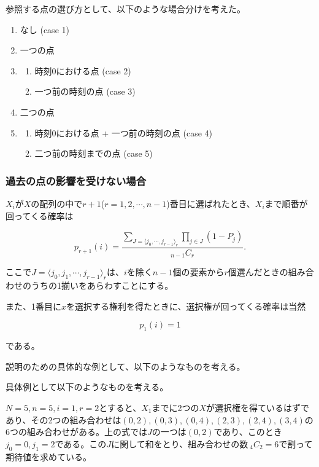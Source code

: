 参照する点の選び方として、以下のような場合分けを考えた。

\begin{enumerate}
    \item なし (case 1)
    \item 一つの点
    \item \begin{enumerate}
        \item 時刻0における点 (case 2)
        \item 一つ前の時刻の点 (case 3)
        \end{enumerate}
    \item 二つの点
    \item \begin{enumerate}
        \item 時刻0における点 + 一つ前の時刻の点 (case 4)
        \item 二つ前の時刻までの点 (case 5)
        \end{enumerate}
\end{enumerate}

\subsubsection{過去の点の影響を受けない場合}

$X_{i}$が$X$の配列の中で$r+1$($r = 1, 2, \cdots , n-1$)番目に選ばれたとき、$X_{i}$まで順番が回ってくる確率は

$$p_{r+1}(i) = \frac{\sum_{J = \langle j_{0}, \cdots ,j_{r-1} \rangle _{r}}\prod_{j\in J}(1-P_{j})}{_{n-1}C_{r}}.$$

ここで$J = \langle j_{0}, j_{1}, \cdots ,j_{r-1} \rangle_{r}$は、$i$を除く$n-1$個の要素から$r$個選んだときの組み合わせのうちの1揃いをあらわすことにする。

また、1番目に$x$を選択する権利を得たときに、選択権が回ってくる確率は当然

$$p_{1}(i) = 1$$

である。

説明のための具体的な例として、以下のようなものを考える。

具体例として以下のようなものを考える。

$N = 5, n = 5, i = 1, r = 2$とすると、$X_{1}$までに2つの$X$が選択権を得ているはずであり、その2つの組み合わせは$(0,2), (0,3), (0,4), (2,3), (2,4), (3,4)$の6つの組み合わせがある。上の式では$J$の一つは$(0, 2)$であり、このとき$j_{0} = 0, j_{1} = 2$である。この$J$に関して和をとり、組み合わせの数$\ _{4}C_{2} = 6$で割って期待値を求めている。

